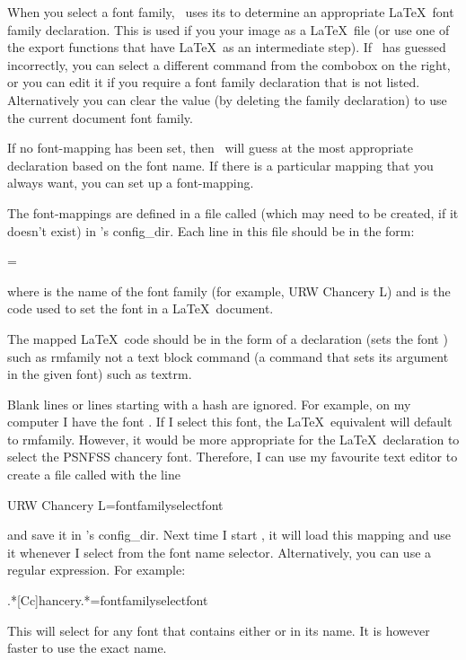 When you select a font family, \FlowframTk\ uses its
 to determine
an appropriate \LaTeX\ font family declaration.  This is used if you
 your image as a \LaTeX\ file (or use one of the
export functions that have \LaTeX\ as an intermediate step). If
\FlowframTk\ has guessed incorrectly, you can select a different
command from the \gls{combobox} on the right, or you can edit it if
you require a font family declaration that is not listed.
Alternatively you can clear the value (by deleting the family
declaration) to use the current document font family.

If no \gls{font-mapping} has been set, then \FlowframTk\ will guess
at the most appropriate declaration based on the font name.
If there is a particular mapping that you always
want, you can set up a \gls{font-mapping}.

The \glspl{font-mapping} are defined in a file called
 (which may need to be created, if it
doesn't exist) in \FlowframTk's \gls{config_dir}.
Each line in this file should be in the form:
\begin{compactcodebox}
=
\end{compactcodebox}%
where  is the name of the font family (for example,
URW Chancery L) and  is the
code used to set the font in a \LaTeX\ document.

\begin{information}
The mapped \LaTeX\ code should be in the form of a declaration (sets
the font ) such as \gls{rmfamily} not a 
text block command (a command that sets its argument in the given font)
such as \gls{textrm}.
\end{information}

Blank lines or lines starting with a \gls{hash} are ignored. For
example, on my computer I have the font . If I
select this font, the \LaTeX\ equivalent will default to
\gls{rmfamily}. However, it would be more appropriate for the
\LaTeX\ declaration to select the PSNFSS chancery font. Therefore, I
can use my favourite text editor to create a file called
 with the line
\begin{compactcodebox*}
URW Chancery L=\gls{fontfamily}\gls{selectfont}
\end{compactcodebox*}%
and save it in \FlowframTk's \gls{config_dir}. Next time I
start \FlowframTk, it will load this mapping and use it whenever
I select  from the font name selector.
Alternatively, you can use a regular expression. For example:
\begin{compactcodebox*}
.*[Cc]hancery.*=\gls{fontfamily}\gls{selectfont}
\end{compactcodebox*}%
This will select  for any font
that contains either  or  in its name.
It is however faster to use the exact name.

